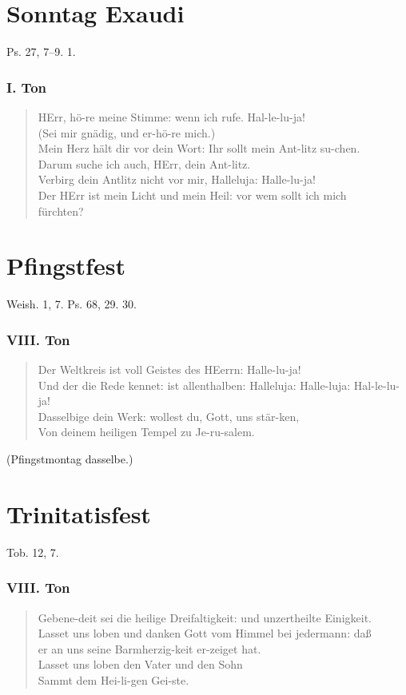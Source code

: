 \section{Sonntag Exaudi}

Ps. 27, 7–9. 1.

\subsubsection{I. Ton}
\begin{verse}
HErr, hö-re meine Stimme: wenn ich rufe. Hal-le-lu-ja!\\
(Sei mir gnädig, und er-hö-re mich.)\\
Mein Herz hält dir vor dein Wort: Ihr sollt mein Ant-litz su-chen.\\
Darum suche ich auch, HErr, dein Ant-litz.\\
Verbirg dein Antlitz nicht vor mir, Halleluja: Halle-lu-ja!\\
Der HErr ist mein Licht und mein Heil: vor wem sollt ich mich\\
fürchten?
\end{verse}

\section{Pfingstfest}

Weish. 1, 7. Ps. 68, 29. 30.

\subsubsection{VIII. Ton}
\begin{verse}
Der Weltkreis ist voll Geistes des HEerrn: Halle-lu-ja!\\
Und der die Rede kennet: ist allenthalben: Halleluja: Halle-luja: Hal-le-lu-ja!\\
Dasselbige dein Werk: wollest du, Gott, uns stär-ken,\\
Von deinem heiligen Tempel zu Je-ru-salem.
\end{verse}

(Pfingstmontag dasselbe.)

\section{Trinitatisfest}

Tob. 12, 7.

\subsubsection{VIII. Ton}
\begin{verse}
Gebene-deit sei die heilige Dreifaltigkeit: und unzertheilte Einigkeit.\\
Lasset uns loben und danken Gott vom Himmel bei jedermann: daß\\
er an uns seine Barmherzig-keit er-zeiget hat.\\
Lasset uns loben den Vater und den Sohn\\
Sammt dem Hei-li-gen Gei-ste.
\end{verse}

